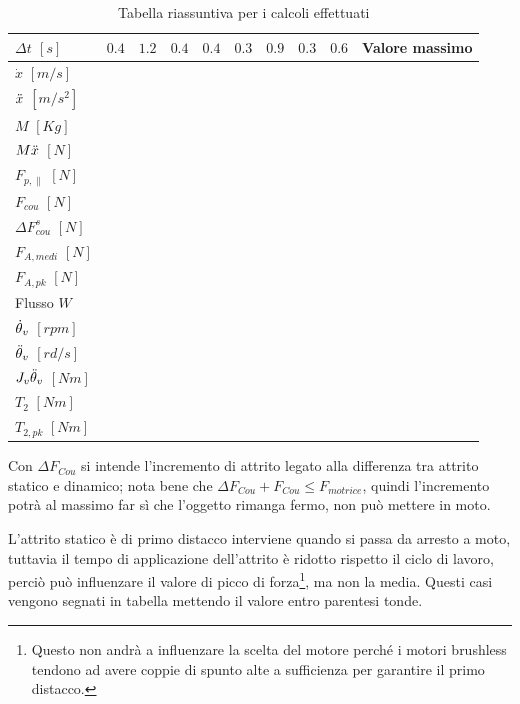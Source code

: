 \begin{table}[h]
\centering
    \begin{tabular}{l|l|l|l|l|l|l|l|l|l}
    \hline
    $\Delta t$ $[s]$ & $0.4$ & $1.2$ & $0.4$ & $0.4$ & $0.3$ & $0.9$ & $0.3$ & $0.6$ & Valore massimo \\ \hline
    $\dot x$ $[m/s]$ & &  &  &  &  &  &  &  & \\ \cline{1-1}
    $\Ddot x$ $[m/s^2]$ &  &  &  &  &  &  &  &  &  \\ \cline{1-1}
    $M$ $[Kg]$ &  &  &  &  &  &  &  &  &  \\ \cline{1-1}
    \hline
    $M \Ddot x$ $[N]$ &  &  &  &  &  &  &  &  &  \\ \cline{1-1}
    $F_{p,\parallel}$ $[N]$ &  &  &  &  &  &  &  &  &  \\ \cline{1-1}
    $F_{cou}$ $[N]$ &  &  &  &  &  &  &  &  &  \\ \cline{1-1}
    $\Delta F_{cou}^s$ $[N]$ &  &  &  &  &  &  &  &  &  \\ \cline{1-1}
    \hline
    $F_{A,medi}$ $[N]$ &  &  &  &  &  &  &  &  &  \\ \cline{1-1}
    $F_{A,pk}$ $[N]$ &  &  &  &  &  &  &  &  &  \\ \cline{1-1}
    Flusso $W$ &  &  &  &  &  &  &  &  &  \\ \cline{1-1}
    \hline
    $\dot{\theta}_v$ $[rpm]$ &  &  &  &  &  &  &  &  &  \\ \cline{1-1}
    $\Ddot{\theta}_v$ $[rd/s]$ &  &  &  &  &  &  &  &  &  \\ \cline{1-1}
    \hline
    $J_v\Ddot{\theta}_v$ $[Nm]$  &  &  &  &  &  &  &  &  &  \\ \cline{1-1}
    $T_2$ $[Nm]$ &  &  &  &  &  &  &  &  &  \\ \cline{1-1}
    $T_{2,pk}$ $[Nm]$ &  &  &  &  &  &  &  &  &  \\ \cline{1-1}
    \end{tabular}
    \caption{Tabella riassuntiva per i calcoli effettuati}
\end{table}

Con $\Delta F_{Cou}$ si intende l'incremento di attrito legato alla differenza tra attrito statico e dinamico; nota bene che $\Delta F_{Cou} + F_{Cou} \leqslant F_{motrice}$, quindi l'incremento potrà al massimo far sì che l'oggetto rimanga fermo, non può mettere in moto.

L'attrito statico è di primo distacco interviene quando si passa da arresto a moto, tuttavia il tempo di applicazione dell'attrito è ridotto rispetto il ciclo di lavoro, perciò può influenzare il valore di picco di forza\footnote{Questo non andrà a influenzare la scelta del motore perché i motori brushless tendono ad avere coppie di spunto alte a sufficienza per garantire il primo distacco.}, ma non la media. Questi casi vengono segnati in tabella mettendo il valore entro parentesi tonde.

